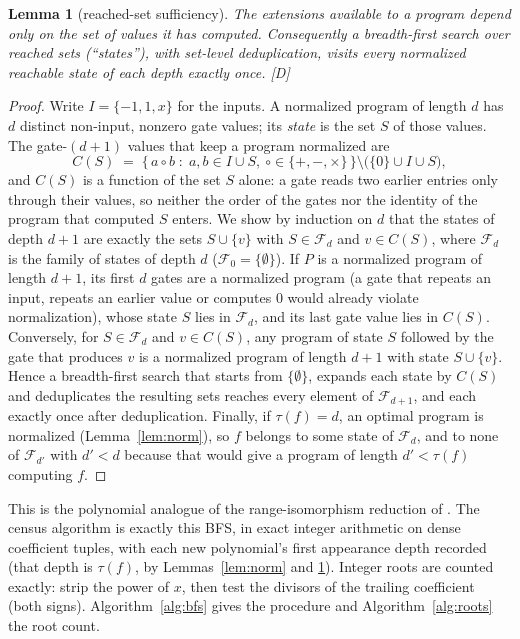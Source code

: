 \documentclass[11pt]{article}
\newtheorem{lemma}[theorem]{Lemma}
\theoremstyle{definition}
\theoremstyle{remark}
\begin{document}
\begin{lemma}[reached-set sufficiency]\label{lem:state}
The extensions available to a program depend only on the \emph{set} of values it has
computed. Consequently a breadth-first search over reached sets (``states''), with
set-level deduplication, visits every normalized reachable state of each depth
exactly once. \emph{[D]}
\end{lemma}
\begin{proof}
Write $I = \{-1, 1, x\}$ for the inputs. A normalized program of length $d$ has $d$
distinct non-input, nonzero gate values; its \emph{state} is the set $S$ of those values.
The gate-$(d{+}1)$ values that keep a program normalized are
\[
  C(S) \;=\; \bigl\{\, a \circ b \;:\; a, b \in I \cup S,\ \circ \in \{+,-,\times\} \,\bigr\}
  \setminus \bigl( \{0\} \cup I \cup S \bigr),
\]
and $C(S)$ is a function of the set $S$ alone: a gate reads two earlier entries only through
their values, so neither the order of the gates nor the identity of the program that
computed $S$ enters. We show by induction on $d$ that the states of depth $d{+}1$ are exactly
the sets $S \cup \{v\}$ with $S \in \mathcal{F}_d$ and $v \in C(S)$, where $\mathcal{F}_d$
is the family of states of depth $d$ ($\mathcal{F}_0 = \{\emptyset\}$). If $P$ is a
normalized program of length $d{+}1$, its first $d$ gates are a normalized program (a
gate that repeats an input, repeats an earlier value or computes $0$ would already
violate normalization), whose state $S$ lies in $\mathcal{F}_d$, and its last gate value
lies in $C(S)$. Conversely, for $S \in \mathcal{F}_d$ and $v \in C(S)$, any program of
state $S$ followed by the gate that produces $v$ is a normalized program of length
$d{+}1$ with state $S \cup \{v\}$. Hence a breadth-first search that starts from
$\{\emptyset\}$, expands each state by $C(S)$ and deduplicates the resulting sets reaches
every element of $\mathcal{F}_{d+1}$, and each exactly once after deduplication. Finally,
if $\tau(f) = d$, an optimal program is normalized (Lemma~\ref{lem:norm}), so $f$ belongs to
some state of $\mathcal{F}_d$, and to none of $\mathcal{F}_{d'}$ with $d' < d$ because
that would give a program of length $d' < \tau(f)$ computing $f$.
\end{proof}

This is the polynomial analogue of the range-isomorphism reduction of
\cite{Markstrom2014}. The census algorithm is exactly this BFS, in exact integer
arithmetic on dense coefficient tuples, with each new polynomial's first appearance
depth recorded (that depth is $\tau(f)$, by Lemmas~\ref{lem:norm} and
\ref{lem:state}). Integer roots are counted exactly: strip the power of $x$, then
test the divisors of the trailing coefficient (both signs). Algorithm~\ref{alg:bfs} gives
the procedure and Algorithm~\ref{alg:roots} the root count.
\end{document}
